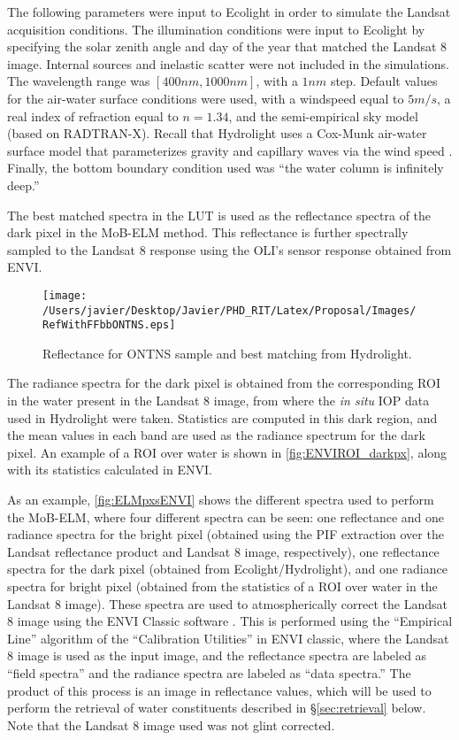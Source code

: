 The following parameters were input to Ecolight in order to simulate the Landsat acquisition conditions. The illumination conditions were input to Ecolight by specifying the solar zenith angle and day of the year that matched the Landsat 8 image. Internal sources and inelastic scatter were not included in the simulations. The wavelength range was $[400nm,1000nm]$, with a $1nm$ step. Default values for the air-water surface conditions were used, with a windspeed equal to $5m/s$, a real index of refraction equal to $n=1.34$, and the semi-empirical sky model (based on RADTRAN-X). Recall that Hydrolight uses a Cox-Munk air-water surface model that parameterizes gravity and capillary waves via the wind speed \citep{Cox1954_mea_sea,Cox1954_stats_sea_surf}. Finally, the bottom boundary condition used was ``the water column is infinitely deep.''

The best matched spectra in the LUT is used as the reflectance spectra of the dark pixel in the MoB-ELM method. This reflectance is further spectrally sampled to the Landsat 8 response using the OLI's sensor response obtained from ENVI. 

\begin{figure}[htb]
  	\centering
  	\texttt{[image: /Users/javier/Desktop/Javier/PHD\_RIT/Latex/Proposal/Images/RefWithFFbbONTNS.eps]}
  \caption{Reflectance for ONTNS sample and best matching from Hydrolight. \label{fig:BestMatchONTNS} } 
\end{figure}

The radiance spectra for the dark pixel is obtained from the corresponding ROI in the water present in the Landsat 8 image, from where the {\it in situ} IOP data used in Hydrolight were taken. Statistics are computed in this dark region, and the mean values in each band are used as the radiance spectrum for the dark pixel. An example of a ROI over water is shown in \autoref{fig:ENVIROI_darkpx}, along with its statistics calculated in ENVI.

As an example, \autoref{fig:ELMpxsENVI} shows the different spectra used to perform the MoB-ELM, where four different spectra can be seen: one reflectance and one radiance spectra for the bright pixel (obtained using the PIF extraction over the Landsat reflectance product and Landsat 8 image, respectively), one reflectance spectra for the dark pixel (obtained from Ecolight/Hydrolight), and one radiance spectra for bright pixel (obtained from the statistics of a ROI over water in the Landsat 8 image). These spectra are used to atmospherically correct the Landsat 8 image using the ENVI Classic software \citep{ENVIUserGuide}. This is performed using the ``Empirical Line'' algorithm of the ``Calibration Utilities'' in ENVI classic, where the Landsat 8 image is used as the input image, and the reflectance spectra are labeled as ``field spectra'' and the radiance spectra are labeled as ``data spectra.'' The product of this process is an image in reflectance values, which will be used to perform the retrieval of water constituents described in \S\ref{sec:retrieval} below. Note that the Landsat 8 image used was not glint corrected.

